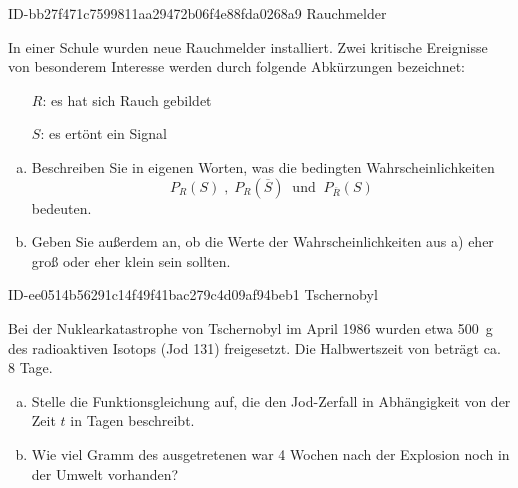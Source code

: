 \begin{exercise}
      {ID-bb27f471c7599811aa29472b06f4e88fda0268a9}
      {Rauchmelder}
  \ifproblem\problem\par
    In einer Schule wurden neue Rauchmelder
    installiert.
    Zwei kritische Ereignisse von besonderem
    Interesse werden durch folgende Abkürzungen
    bezeichnet:
    \begin{itemize}
      \renewcommand{\itemsep}{-1ex}%
      \item[$R$:]\glqq es hat sich Rauch gebildet\grqq
      \item[$S$:]\glqq es ertönt ein Signal\grqq
    \end{itemize}
    \begin{enumerate}[a)]
      \item Beschreiben Sie in eigenen Worten, was die
            bedingten Wahrscheinlichkeiten
            \begin{equation*}
              P_R(S)
              \;,\;
              P_R(\overline{S})
              \;\;\text{und}\;\;
              P_{\overline{R}}(S)
            \end{equation*}
            bedeuten.
      \item Geben Sie außerdem an, ob die
            Werte der Wahrscheinlichkeiten aus
            a) eher groß oder eher klein sein
            sollten.
    \end{enumerate}
  \fi
\end{exercise}

\begin{exercise}
      {ID-ee0514b56291c14f49f41bac279c4d09af94beb1}
      {Tschernobyl}
  \ifproblem\problem\par
    Bei der Nuklearkatastrophe von Tschernobyl
    im April 1986 wurden etwa \SI{500}{\gram}
    des radioaktiven Isotops 
    (\glqq Jod 131\grqq) freigesetzt.
    Die Halbwertszeit von 
    beträgt ca. \num{8} Tage.
    \begin{enumerate}[a)]
      \item Stelle die Funktionsgleichung auf, die
            den Jod-Zerfall in Abhängigkeit von der
            Zeit $t$ in Tagen beschreibt.
      \item Wie viel Gramm des ausgetretenen
             war \num{4} Wochen
            nach der Explosion noch in der Umwelt
            vorhanden?
    \end{enumerate}
  \fi
\end{exercise}



